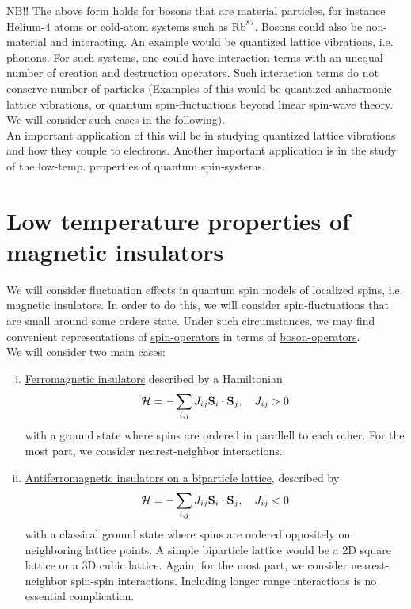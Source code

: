 NB!! The above form holds for bosons that are material particles, for instance Helium-4 atoms or cold-atom systems such as $\text{Rb}^{87}$. Bosons could also be non-material and interacting. An example would be quantized lattice vibrations, i.e. \uline{phonons}. For such systems, one could have interaction terms with an unequal number of creation and destruction operators. Such interaction terms do not conserve number of particles (Examples of this would be quantized anharmonic lattice vibrations, or quantum spin-fluctuations beyond linear spin-wave theory. We will consider such cases in the following). \\

An important application of this will be in studying quantized lattice vibrations and how they couple to electrons. Another important application is in the study of the low-temp. properties of quantum spin-systems. \\

\section{Low temperature properties of magnetic insulators}

We will consider fluctuation effects in quantum spin models of localized spins, i.e. magnetic insulators. In order to do this, we will consider spin-fluctuations that are small around some ordere state. Under such circumstances, we may find convenient representations of \uline{spin-operators} in terms of \uline{boson-operators}. \\

We will consider two main cases:
\begin{enumerate}[i)]
	\item \uline{Ferromagnetic insulators} described by a Hamiltonian
	\begin{equation}
		\mathcal{H} = -\sum_{i, j} J_{ij} \vb{S}_i\cdot\vb{S}_j, \quad J_{ij} > 0
	\end{equation}
	with a ground state where spins are ordered in parallell to each other. For the most part, we consider nearest-neighbor interactions.
	\item \uline{Antiferromagnetic insulators on a biparticle lattice}, described by
	\begin{equation}
		\mathcal{H} = -\sum_{i, j} J_{ij} \vb{S}_i\cdot\vb{S}_j, \quad J_{ij} < 0
	\end{equation}
	with a classical ground state where spins are ordered oppositely on neighboring lattice points. A simple biparticle lattice would be a 2D square lattice or a 3D cubic lattice. Again, for the most part, we consider nearest-neighbor spin-spin interactions. Including longer range interactions is no essential complication.
\end{enumerate}


